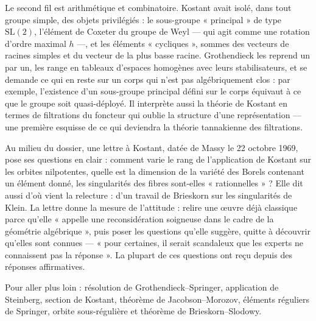 \documentclass[11pt,a4paper]{article}
\begin{document}
\begin{resume}
Le second fil est arithmétique et combinatoire. Kostant avait isolé, dans tout
groupe simple, des objets privilégiés : le sous-groupe « principal » de type
$\mathrm{SL}(2)$, l'élément de Coxeter du groupe de Weyl — qui agit comme une
rotation d'ordre maximal $h$ —, et les éléments « cycliques », sommes des
vecteurs de racines simples et du vecteur de la plus basse racine. Grothendieck
les reprend un par un, les range en tableaux d'espaces homogènes avec leurs
stabilisateurs, et se demande ce qui en reste sur un corps qui n'est pas
algébriquement clos : par exemple, l'existence d'un sous-groupe principal défini
sur le corps équivaut à ce que le groupe soit quasi-déployé. Il interprète aussi
la théorie de Kostant en termes de filtrations du foncteur qui oublie la
structure d'une représentation — une première esquisse de ce qui deviendra la
théorie tannakienne des filtrations.

Au milieu du dossier, une lettre à Kostant, datée de Massy le 22 octobre 1969,
pose ses questions en clair : comment varie le rang de l'application de Kostant
sur les orbites nilpotentes, quelle est la dimension de la variété des Borels
contenant un élément donné, les singularités des fibres sont-elles
« rationnelles » ? Elle dit aussi d'où vient la relecture : d'un travail de
Brieskorn sur les singularités de Klein. La lettre donne la mesure de
l'attitude : relire une œuvre déjà classique parce qu'elle « appelle une
reconsidération soigneuse dans le cadre de la géométrie algébrique », puis poser
les questions qu'elle suggère, quitte à découvrir qu'elles sont connues —
« pour certaines, il serait scandaleux que les experts ne connaissent pas la
réponse ». La plupart de ces questions ont reçu depuis des réponses affirmatives.

Pour aller plus loin : résolution de Grothendieck--Springer, application de
Steinberg, section de Kostant, théorème de Jacobson--Morozov, éléments réguliers
de Springer, orbite sous-régulière et théorème de Brieskorn--Slodowy.

\end{resume}
\end{document}
